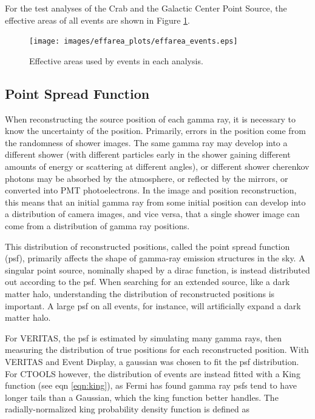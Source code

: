     For the test analyses of the Crab and the Galactic Center Point Source, the effective areas of all events are shown in Figure \ref{fig:effarea_usage}.

    \begin{figure}[ht]
      \centering
      \texttt{[image: images/effarea\_plots/effarea\_events.eps]}
      \caption[Effective Areas Used]
      {Effective areas used by events in each analysis.}
      \label{fig:effarea_usage}
    \end{figure}

    \subsection{Point Spread Function}\label{subsec:psf}

    When reconstructing the source position of each gamma ray, it is necessary to know the uncertainty of the position.
    Primarily, errors in the position come from the randomness of shower images.
    The same gamma ray may develop into a different shower (with different particles early in the shower gaining different amounts of energy or scattering at different angles), or different shower cherenkov photons may be absorbed by the atmosphere, or reflected by the mirrors, or converted into PMT photoelectrons.
    In the image and position reconstruction, this means that an initial gamma ray from some initial position can develop into a distribution of camera images, and vice versa, that a single shower image can come from a distribution of gamma ray positions.

    This distribution of reconstructed positions, called the point spread function (psf), primarily affects the shape of gamma-ray emission structures in the sky.
    A singular point source, nominally shaped by a dirac function, is instead distributed out according to the psf.
    When searching for an extended source, like a dark matter halo, understanding the distribution of reconstructed positions is important.
    A large psf on all events, for instance, will artificially expand a dark matter halo.

    For VERITAS, the psf is estimated by simulating many gamma rays, then measuring the distribution of true positions for each reconstructed position.
    With VERITAS and Event Display, a gaussian was chosen to fit the psf distribution.
    For CTOOLS however, the distribution of events are instead fitted with a King function \cite{king1962} (see eqn \ref{eqn:king}), as Fermi \cite{fermipsf} has found gamma ray psfs tend to have longer tails than a Gaussian, which the king function better handles.
    The radially-normalized king probability density function is defined as

